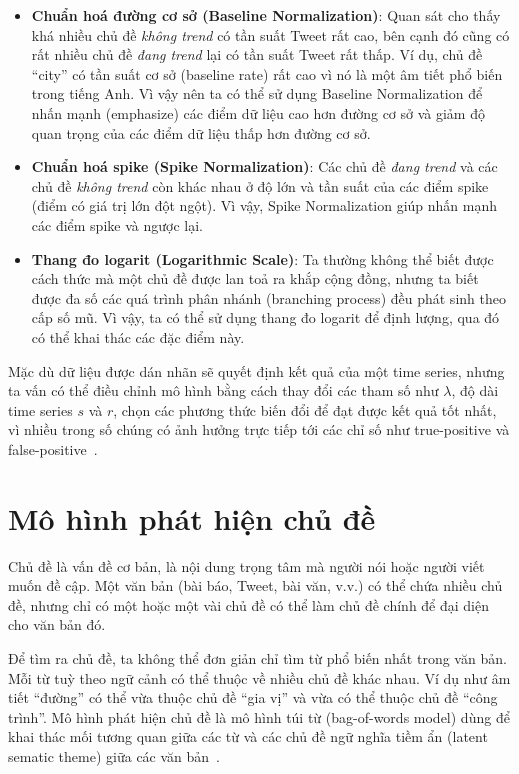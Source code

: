 \begin{itemize}
	\item \textbf{Chuẩn hoá đường cơ sở (Baseline Normalization)}: Quan sát cho thấy khá nhiều chủ đề \textit{không trend} có tần suất Tweet rất cao, bên cạnh đó cũng có rất nhiều chủ đề \textit{đang trend} lại có tần suất Tweet rất thấp. Ví dụ, chủ đề ``city'' có tần suất cơ sở (baseline rate) rất cao vì nó là một âm tiết phổ biến trong tiếng Anh. Vì vậy nên ta có thể sử dụng Baseline Normalization để nhấn mạnh (emphasize) các điểm dữ liệu cao hơn đường cơ sở và giảm độ quan trọng của các điểm dữ liệu thấp hơn đường cơ sở.
	
	\item \textbf{Chuẩn hoá spike (Spike Normalization)}: Các chủ đề \textit{đang trend} và các chủ đề \textit{không trend} còn khác nhau ở độ lớn và tần suất của các điểm spike (điểm có giá trị lớn đột ngột).  Vì vậy, Spike Normalization giúp nhấn mạnh các điểm spike và ngược lại.
	
	\item \textbf{Thang đo logarit (Logarithmic Scale)}: Ta thường không thể biết được cách thức mà một chủ đề được lan toả ra khắp cộng đồng, nhưng ta biết được đa số các quá trình phân nhánh (branching process) đều phát sinh theo cấp số mũ. Vì vậy, ta có thể sử dụng thang đo logarit để định lượng, qua đó có thể khai thác các đặc điểm này.

\end{itemize}

Mặc dù dữ liệu được dán nhãn sẽ quyết định kết quả của một time series, nhưng ta vấn có thể điều chỉnh mô hình bằng cách thay đổi các tham số như $\lambda$, độ dài time series $s$ và $r$, chọn các phương thức biến đổi để đạt được kết quả tốt nhất, vì nhiều trong số chúng có ảnh hưởng trực tiếp tới các chỉ số như true-positive và false-positive~\cite{hendricksonTrendDetectionSocial2015}.

\section{Mô hình phát hiện chủ đề}
Chủ đề là vấn đề cơ bản, là nội dung trọng tâm mà người nói hoặc người viết muốn đề cập. Một văn bản (bài báo, Tweet, bài văn, v.v.) có thể chứa nhiều chủ đề, nhưng chỉ có một hoặc một vài chủ đề có thể làm chủ đề chính để đại diện cho văn bản đó.

Để tìm ra chủ đề, ta không thể đơn giản chỉ tìm từ phổ biến nhất trong văn bản.  Mỗi từ tuỳ theo ngữ cảnh có thể thuộc về nhiều chủ đề khác nhau. Ví dụ như âm tiết ``đường'' có thể vừa thuộc chủ đề ``gia vị'' và vừa có thể thuộc chủ đề ``công trình''. Mô hình phát hiện chủ đề là mô hình túi từ (bag-of-words model) dùng để khai thác mối tương quan giữa các từ và các chủ đề ngữ nghĩa tiềm ẩn (latent sematic theme) giữa các văn bản~\cite{madaniRealtimeTrendingTopics2015}.

